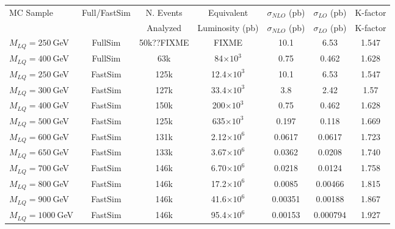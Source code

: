 \begin{table}[htb]
  \label{tab:NumEvents}
  \begin{center}
    \begin{tabular}{|l|cccccc|} \hline\hline
      MC Sample                   & Full/FastSim & N. Events & Equivalent             & $\sigma_{NLO}$ (pb) & $\sigma_{LO}$ (pb) & K-factor \\
                                  &              & Analyzed  & Luminosity (pb)        & $\sigma_{NLO}$ (pb) & $\sigma_{LO}$ (pb) & K-factor \\ \hline\hline
      $M_{LQ}=250~$GeV            & FullSim      & 50k??FIXME&       FIXME            & 10.1                & 6.53               & 1.547\\
      $M_{LQ}=400~$GeV            & FullSim      & 63k       &      84$\times 10^3$   &  0.75		    & 0.462		 & 1.628\\ \hline
      $M_{LQ}=250~$GeV            & FastSim      & 125k      &    12.4$\times 10^3$   & 10.1		    & 6.53		 & 1.547\\
      $M_{LQ}=300~$GeV            & FastSim      & 127k      &    33.4$\times 10^3$   &  3.8		    & 2.42		 & 1.57\\
      $M_{LQ}=400~$GeV            & FastSim      & 150k      &     200$\times 10^3$   &  0.75		    & 0.462		 & 1.628\\
      $M_{LQ}=500~$GeV            & FastSim      & 125k      &     635$\times 10^3$   &  0.197  	    & 0.118		 & 1.669\\
      $M_{LQ}=600~$GeV            & FastSim      & 131k      &    2.12$\times 10^6$   &  0.0617             & 0.0617             & 1.723\\
      $M_{LQ}=650~$GeV            & FastSim      & 133k      &    3.67$\times 10^6$   &  0.0362 	    & 0.0208		 & 1.740\\
      $M_{LQ}=700~$GeV            & FastSim      & 146k      &    6.70$\times 10^6$   &  0.0218 	    & 0.0124		 & 1.758\\
      $M_{LQ}=800~$GeV            & FastSim      & 146k      &    17.2$\times 10^6$   &  0.0085 	    & 0.00466		 & 1.815\\
      $M_{LQ}=900~$GeV            & FastSim      & 146k      &    41.6$\times 10^6$   &  0.00351	    & 0.00188		 & 1.867\\
      $M_{LQ}=1000~$GeV           & FastSim      & 146k      &    95.4$\times 10^6$   &  0.00153            & 0.000794           & 1.927\\ \hline

\end{tabular}
\end{center}
\end{table}
